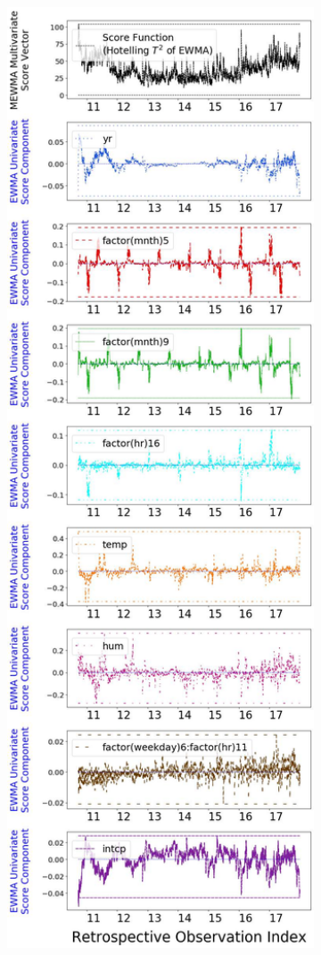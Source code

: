 \documentclass[twoside,11pt]{article}
\begin{document}
\begin{figure}[H]
\centering
    \begin{subfigure}[t]{0.35\linewidth}
     \centering
         \includegraphics[width=1.0\textwidth, trim=.0in .0in .0in .0in, clip]{../figures/v14/bike_sharing/reg_lin_A/quadr/Compressed_PII_pos_single_retro_bike_fisher_mlines_with_regu_1e-08_0_0001_0_01_99_99.png}

\end{subfigure}
\end{figure}
\end{document}
